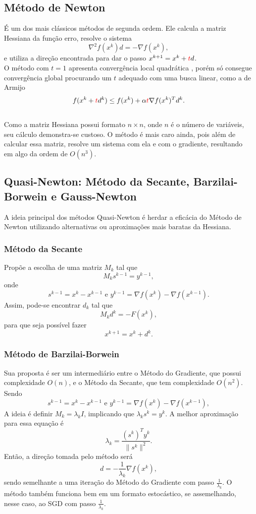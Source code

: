 \documentclass[11pt]{article}
\begin{document}
\subsection*{Método de Newton}
É um dos mais clássicos métodos de segunda ordem. Ele calcula a matriz Hessiana da função erro, resolve o sistema  $$\nabla ^2 f(x^k)d = -\nabla f(x^k),$$ e utiliza a direção encontrada para dar o passo $x^{k + 1} = x^k + {\color {red}t}  d$.\\
O método com $t = 1$ apresenta convergência local quadrática \supercite{newtonJM}, porém só consegue convergência global procurando um $t$ adequado com uma busca linear, como a de Armijo \supercite{armijo1966} $$f(x^k+{\color {red}t}d^k) \leq f(x^k)+\alpha {\color {red}t} \nabla f(x^k)^T d^k.$$\\Como a matriz Hessiana possui formato $n \times n$, onde $n$ é o número de variáveis, seu cálculo demonstra-se custoso. O método é mais caro ainda, pois além de calcular essa matriz, resolve um sistema com ela e com o gradiente, resultando em algo da ordem de $O(n^3)$.

\subsection*{Quasi-Newton: Método da Secante, Barzilai-Borwein e Gauss-Newton}
A ideia principal dos métodos Quasi-Newton é herdar a eficácia do Método de Newton utilizando alternativas ou aproximações mais baratas da Hessiana.
\subsubsection*{Método da Secante}
Propõe a escolha de uma matriz $M_k$ tal que   
		$$M_k s^{k-1}= y^{k-1} ,$$
		onde $$s^{k-1}=x^k-x^{k-1} \text{ e } y^{k-1}=\nabla f(x^k)- \nabla f(x^{k-1}) .$$
Assim, pode-se encontrar $d_k$ tal que
		$$M_kd^k=-F(x^k)  ,$$
		para que seja possível fazer $$x^{k+1}=x^k+d^k .$$

\subsubsection*{Método de Barzilai-Borwein}
Sua proposta é ser um intermediário entre o Método do Gradiente, que possui complexidade $O(n)$, e o Método da Secante, que tem complexidade $O(n^2)$. Sendo 
$$s^{k-1}=x^k-x^{k-1} \text{ e } y^{k-1}=\nabla f(x^k)- \nabla f(x^{k-1}) ,$$
A ideia é definir $M_k = \lambda_k I$, implicando que $\lambda_ks^k=y^k$. A melhor aproximação para essa equação é $$\lambda_k=\frac{(s^k)^Ty^k}{\|s^k\|^2}.$$
Então, a direção tomada pelo método será $$ d = - \frac{1}{\lambda_k} \nabla f(x^k),$$
sendo semelhante a uma iteração do Método do Gradiente com passo $\frac{1}{\lambda _k}$. O método também funciona bem em um formato estocástico, se assemelhando, nesse caso, ao SGD com passo $\frac{1}{\lambda _k}$.
\end{document}
